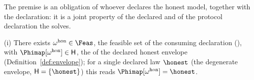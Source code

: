 
The premise is an obligation of whoever declares the honest model, together
with the declaration: it is a joint property of the declared
 and of the protocol declaration the 
solves.

\begin{assumption}\label{ass:reach}
(i) There exists $\omega^{\mathrm{hon}}\in\Feas$, the feasible set of the
consuming declaration (), with
$\Phimap[\omega^{\mathrm{hon}}]\in\mathsf{H}$, the  of the
declared honest envelope (Definition~\ref{def:envelope}); for a single
declared law $\honest$ (the degenerate envelope, $\mathsf{H}=\{\honest\}$)
this reads $\Phimap[\omega^{\mathrm{hon}}]=\honest$.
\end{assumption}
